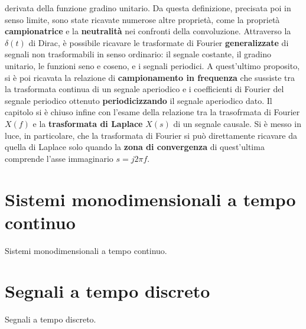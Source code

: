 \documentclass[12pt,oneside,openany]{memoir}
\numberwithin{equation}{subsection}
\begin{document}
derivata della funzione gradino unitario. Da questa definizione, precisata poi
in senso limite, sono state ricavate numerose altre propriet\`a, come la
propriet\`a \textbf{campionatrice} e la \textbf{neutralit\`a} nei confronti
della convoluzione. Attraverso la $\delta(t)$ di Dirac, \`e possibile ricavare
le trasformate di Fourier \textbf{generalizzate} di segnali non trasformabili
in senso ordinario: il segnale costante, il gradino unitario, le funzioni seno e
coseno, e i segnali periodici. A quest'ultimo proposito, si \`e poi ricavata la
relazione di \textbf{campionamento in frequenza} che sussiste tra la trasformata
continua di un segnale aperiodico e i coefficienti di Fourier del segnale
periodico ottenuto \textbf{periodicizzando} il segnale aperiodico dato.
\bigbreak
Il capitolo si \`e chiuso infine con l'esame della relazione tra la trasofrmata
di Fourier $X(f)$ e la \textbf{trasformata di Laplace} $X(s)$ di un segnale
causale. Si \`e messo in luce, in particolare, che la trasformata di Fourier si
pu\`o direttamente ricavare da quella di Laplace solo quando la \textbf{zona di
convergenza} di quest'ultima comprende l'asse immaginario $s = j 2 \pi f$.


\newpage
\section{Sistemi monodimensionali a tempo continuo}
Sistemi monodimensionali a tempo continuo.


\section{Segnali a tempo discreto}
Segnali a tempo discreto.

\end{document}
